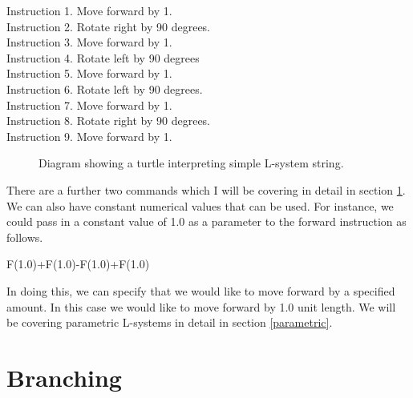 \begin{flushleft}
\vspace{5mm}

Instruction 1. Move forward by 1.\\
Instruction 2. Rotate right by 90 degrees.\\
Instruction 3. Move forward by 1.\\
Instruction 4. Rotate left by 90 degrees \\
Instruction 5. Move forward by 1. \\
Instruction 6. Rotate left by 90 degrees. \\
Instruction 7. Move forward by 1. \\
Instruction 8. Rotate right by 90 degrees. \\
Instruction 9. Move forward by 1.\\

\vspace{5mm}

\begin{figure}[htbp]
	{\centering
		\setlength{\fboxrule}{1pt}
		\vspace{7px}
		\caption{Diagram showing a turtle interpreting simple L-system string.} \label{basic turtle}
	}
\end{figure}
\FloatBarrier

\vspace{5mm}

There are a further two commands which I will be covering in detail in section \ref{branching}. We can also have constant numerical values that can be used. For instance, we could pass in a constant value of 1.0 as a parameter to the forward instruction as follows.

\vspace{5mm}

F(1.0)+F(1.0)-F(1.0)+F(1.0)

\vspace{5mm}

In doing this, we can specify that we would like to move forward by a specified amount. In this case we would like to move forward by 1.0 unit length. We will be covering parametric L-systems in detail in section \ref{parametric}.

\end{flushleft}

\section{Branching} \label{branching}

